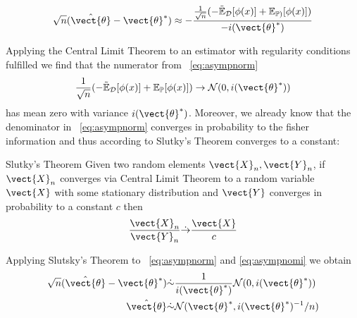       \begin{equation}
        \label{eq:asympnorm}
          \begin{split}
            \sqrt{n}(\hat{\vect{\theta}} - \vect{\theta}^*)  &\approx - \frac{\frac{1}{\sqrt{n}}( -\tilde{\mathbb{E}}_{\mathcal{D}}[\phi(x)] + \mathbb{E}_{\mathbb{P})}[\phi(x)])}{- i(\vect{\theta}^*)} \\
          \end{split}
      \end{equation}

      Applying the Central Limit Theorem to an estimator with regularity conditions fulfilled we find  that the numerator from \eq~\ref{eq:asympnorm}
        \begin{equation}
            \label{eq:asympnomi}
            \frac{1}{\sqrt{n}} ( -\tilde{\mathbb{E}}_{\mathcal{D}}[\phi(x)] + \mathbb{E}_{\mathbb{P}}[\phi(x)]) \rightarrow \mathcal{N}(0, i(\vect{\theta}^*))
        \end{equation}
        has mean zero with variance $i(\vect{\theta}^*)$.
        Moreover, we already know that the denominator in \eq~\ref{eq:asympnorm} converges in probability to the fisher information and thus according to Slutky's Theorem converges to a constant:

        \begin{threm}{Slutky's Theorem \cite{casella2002statistical}}
            Given two random elements $\vect{X}_n, \vect{Y}_n$, if $\vect{X}_n$ converges via Central Limit Theorem to a random variable $\vect{X}$ with some stationary distribution and $\vect{Y}$ converges in probability to a constant $c$ then 
            \begin{equation}
                \frac{\vect{X}_n}{\vect{Y}_n} \dot{\rightarrow} \frac{\vect{X}}{c}
            \end{equation}
        \end{threm}

        Applying Slutsky's Theorem to \eq~\ref{eq:asympnorm} and \ref{eq:asympnomi} we obtain 
        \begin{equation}
            \begin{split}
            \sqrt{n}(\hat{\vect{\theta}} - \vect{\theta}^*)  &\dot{\sim} \frac{1}{ i(\vect{\theta}^*)} \mathcal{N}(0, i(\vect{\theta}^*)) \\
            \hat{\vect{\theta}} &\dot{\sim} \mathcal{N}(\vect{\theta}^*, i(\vect{\theta}^*)^{-1}/n)\\
        \end{split}
        \end{equation}

